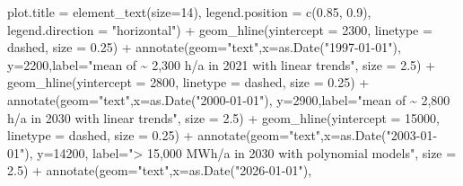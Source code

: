 \documentclass[a4paper,11pt]{article}
\newenvironment{Shaded}{\begin{snugshade}}{\end{snugshade}}
\newcommand{\AttributeTok}[1]{\textcolor[rgb]{0.77,0.63,0.00}{#1}}
\newcommand{\DecValTok}[1]{\textcolor[rgb]{0.00,0.00,0.81}{#1}}
\newcommand{\FloatTok}[1]{\textcolor[rgb]{0.00,0.00,0.81}{#1}}
\newcommand{\FunctionTok}[1]{\textcolor[rgb]{0.00,0.00,0.00}{#1}}
\newcommand{\NormalTok}[1]{#1}
\newcommand{\SpecialCharTok}[1]{\textcolor[rgb]{0.00,0.00,0.00}{#1}}
\newcommand{\StringTok}[1]{\textcolor[rgb]{0.31,0.60,0.02}{#1}}
\begin{document}
\begin{Shaded}
\begin{Highlighting}[]
         \AttributeTok{plot.title =} \FunctionTok{element\_text}\NormalTok{(}\AttributeTok{size=}\DecValTok{14}\NormalTok{),}
         \AttributeTok{legend.position =} \FunctionTok{c}\NormalTok{(}\FloatTok{0.85}\NormalTok{, }\FloatTok{0.9}\NormalTok{),}
         \AttributeTok{legend.direction =} \StringTok{"horizontal"}\NormalTok{) }\SpecialCharTok{+}
  \FunctionTok{geom\_hline}\NormalTok{(}\AttributeTok{yintercept =} \DecValTok{2300}\NormalTok{, }\AttributeTok{linetype =} \StringTok{\textquotesingle{}dashed\textquotesingle{}}\NormalTok{, }\AttributeTok{size =} \FloatTok{0.25}\NormalTok{) }\SpecialCharTok{+}
  \FunctionTok{annotate}\NormalTok{(}\AttributeTok{geom=}\StringTok{"text"}\NormalTok{,}\AttributeTok{x=}\FunctionTok{as.Date}\NormalTok{(}\StringTok{"1997{-}01{-}01"}\NormalTok{),}
           \AttributeTok{y=}\DecValTok{2200}\NormalTok{,}\AttributeTok{label=}\StringTok{"mean of \textasciitilde{} 2,300 h/a in 2021 with linear trends"}\NormalTok{, }
           \AttributeTok{size =} \FloatTok{2.5}\NormalTok{) }\SpecialCharTok{+}
  \FunctionTok{geom\_hline}\NormalTok{(}\AttributeTok{yintercept =} \DecValTok{2800}\NormalTok{, }\AttributeTok{linetype =} \StringTok{\textquotesingle{}dashed\textquotesingle{}}\NormalTok{, }\AttributeTok{size =} \FloatTok{0.25}\NormalTok{) }\SpecialCharTok{+}
  \FunctionTok{annotate}\NormalTok{(}\AttributeTok{geom=}\StringTok{"text"}\NormalTok{,}\AttributeTok{x=}\FunctionTok{as.Date}\NormalTok{(}\StringTok{"2000{-}01{-}01"}\NormalTok{),}
           \AttributeTok{y=}\DecValTok{2900}\NormalTok{,}\AttributeTok{label=}\StringTok{"mean of \textasciitilde{} 2,800 h/a in 2030 with linear trends"}\NormalTok{, }
           \AttributeTok{size =} \FloatTok{2.5}\NormalTok{) }\SpecialCharTok{+}
  \FunctionTok{geom\_hline}\NormalTok{(}\AttributeTok{yintercept =} \DecValTok{15000}\NormalTok{, }\AttributeTok{linetype =} \StringTok{\textquotesingle{}dashed\textquotesingle{}}\NormalTok{, }\AttributeTok{size =} \FloatTok{0.25}\NormalTok{) }\SpecialCharTok{+}
  \FunctionTok{annotate}\NormalTok{(}\AttributeTok{geom=}\StringTok{"text"}\NormalTok{,}\AttributeTok{x=}\FunctionTok{as.Date}\NormalTok{(}\StringTok{"2003{-}01{-}01"}\NormalTok{),}
           \AttributeTok{y=}\DecValTok{14200}\NormalTok{, }\AttributeTok{label=}\StringTok{"\textgreater{} 15,000 MWh/a in 2030 with polynomial models"}\NormalTok{, }
           \AttributeTok{size =} \FloatTok{2.5}\NormalTok{) }\SpecialCharTok{+}
  \FunctionTok{annotate}\NormalTok{(}\AttributeTok{geom=}\StringTok{"text"}\NormalTok{,}\AttributeTok{x=}\FunctionTok{as.Date}\NormalTok{(}\StringTok{"2026{-}01{-}01"}\NormalTok{),}

\end{Highlighting}
\end{Shaded}
\end{document}
